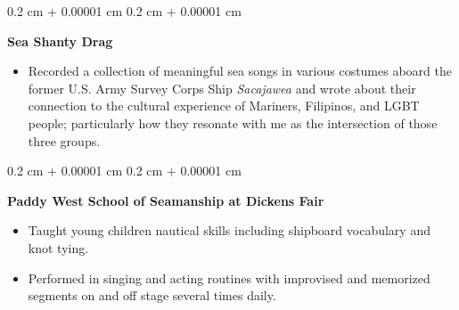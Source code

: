 \documentclass[10pt, letterpaper]{article}
\newenvironment{highlights}{
    \begin{itemize}[
        topsep=0.10 cm,
        parsep=0.10 cm,
        partopsep=0pt,
        itemsep=0pt,
        leftmargin=0.4 cm + 10pt
    ]
}{
    \end{itemize}
} %
\newenvironment{onecolentry}{
    \begin{adjustwidth}{
        0.2 cm + 0.00001 cm
    }{
        0.2 cm + 0.00001 cm
    }
}{
    \end{adjustwidth}
} %
\newenvironment{twocolentry}[2][]{
    \onecolentry
    \def\secondColumn{#2}
    \setcolumnwidth{\fill, 4.5 cm}
    \begin{paracol}{2}
}{
    \switchcolumn \raggedleft \secondColumn
    \end{paracol}
    \endonecolentry
} %
\begin{document}
        \vspace{0.2 cm}

        \begin{twocolentry}{
            2023
        }
            \textbf{Sea Shanty Drag}
            \begin{highlights}
                \item Recorded a collection of meaningful sea songs in various costumes aboard the former U.S. Army Survey Corps Ship \textit{Sacajawea} and wrote about their connection to the cultural experience of Mariners, Filipinos, and LGBT people; particularly how they resonate with me as the intersection of those three groups.
            \end{highlights}
        \end{twocolentry}


        \vspace{0.2 cm}

        \begin{onecolentry}
            \textbf{Paddy West School of Seamanship at Dickens Fair}
            \begin{highlights}
                \item Taught young children nautical skills including shipboard vocabulary and knot tying.
                \item Performed in singing and acting routines with improvised and memorized segments on and off stage several times daily.
            \end{highlights}
        \end{onecolentry}



    
\end{document}

